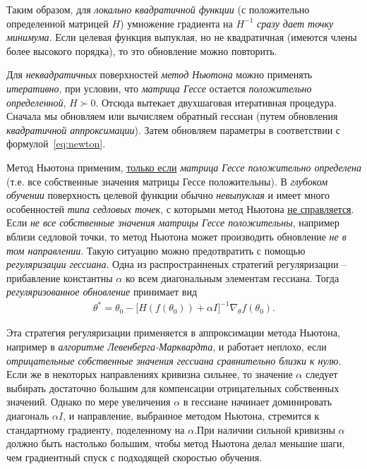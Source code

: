 \documentclass[%
	11pt,
	a4paper,
	utf8,
]{article}
\begin{document}
Таким образом, для \emph{локально квадратичной функции} (с положительно определенной матрицей $ H $) умножение градиента на $ H^{-1} $ \emph{\color{blue}сразу дает точку минимума}. Если целевая функция выпуклая, но не квадратичная (имеются члены более высокого порядка), то это обновление можно повторить.

Для \emph{неквадратичных} поверхностей \emph{метод Ньютона} можно применять \emph{итеративно}, при условии, что \emph{матрица Гессе} остается \emph{положительно определенной}, $ H \succ 0 $. Отсюда вытекает двухшаговая итеративная процедура. Сначала мы обновляем или вычисляем обратный гессиан (путем обновления \emph{квадратичной аппроксимации}). Затем обновляем параметры в соответствии с формулой~\eqref{eq:newton}.

Метод Ньютона применим, \underline{только если} \emph{матрица Гессе положительно определена} (т.е. все собственные значения матрицы Гессе положительны). В \emph{глубоком обучении} поверхность целевой функции обычно \emph{невыпуклая} и имеет много особенностей \emph{типа седловых точек}, с которыми метод Ньютона \underline{не справляется}. Если \emph{не все собственные значения матрицы Гессе положительны}, например вблизи седловой точки, то метод Ньютона может производить обновление \emph{не в том направлении}. Такую ситуацию можно предотвратить с помощью \emph{регуляризации гессиана}. Одна из распространненых стратегий регуляризации -- прибавление константны $ \alpha $ ко всем диагональным элементам гессиана. Тогда \emph{регуляризованное обновление} принимает вид
\begin{align*}
	\theta^* = \theta_0 - \big[ H(f(\theta_0)) + \alpha I \big]^{-1} \nabla_{\theta} f(\theta_0).
\end{align*}

Эта стратегия регуляризации применяется в аппроксимации метода Ньютона, например в \emph{алгоритме Левенберга-Марквардта}, и работает неплохо, если \emph{отрицательные собственные значения гессиана сравнительно близки к нулю}. Если же в некоторых направлениях кривизна сильнее, то значение $ \alpha $ следует выбирать достаточно большим для компенсации отрицательных собственных значений. Однако по мере увеличения $ \alpha $ в гессиане начинает доминировать диагональ $ \alpha I $, и направление, выбранное методом Ньютона, стремится к стандартному градиенту, поделенному на $ \alpha $.При наличии сильной кривизны $ \alpha $ должно быть настолько большим, чтобы метод Ньютона делал меньшие шаги, чем градиентный спуск с подходящей скоростью обучения.
\end{document}
